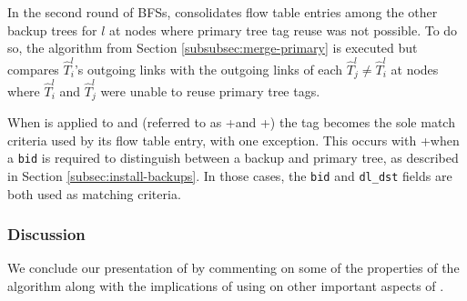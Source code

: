 In the second round of BFSs, \merge consolidates flow table entries among the other backup trees for $l$
at nodes where primary tree tag reuse was not possible.  
To do so, the algorithm from Section \ref{subsubsec:merge-primary} is executed but compares $\hat{T}_i^l$'s outgoing links with the outgoing links of 
each $\hat{T}_j^l \neq \hat{T}_i^l$ at nodes where $\hat{T}_i^l$ and $\hat{T}_j^l$ were unable to reuse primary tree tags. 

When \merge is applied to \pre and \post (referred to as \pres+\merge and \posts+\merges) the tag becomes the sole match criteria used by its flow table entry, with one exception.  This 
occurs with \pres+\merge when a {\tt bid} is required to distinguish between a backup and primary tree, as described in Section \ref{subsec:install-backups}. In those cases, the 
{\tt bid} and {\tt dl\_dst} fields are both used as matching criteria.





\subsubsection{\mergen Discussion}
\label{subsubsec:merge-discuss}

We conclude our presentation of \merge by commenting on some of the properties of the algorithm along with the implications of using \merge on other important aspects of \mdrs.

